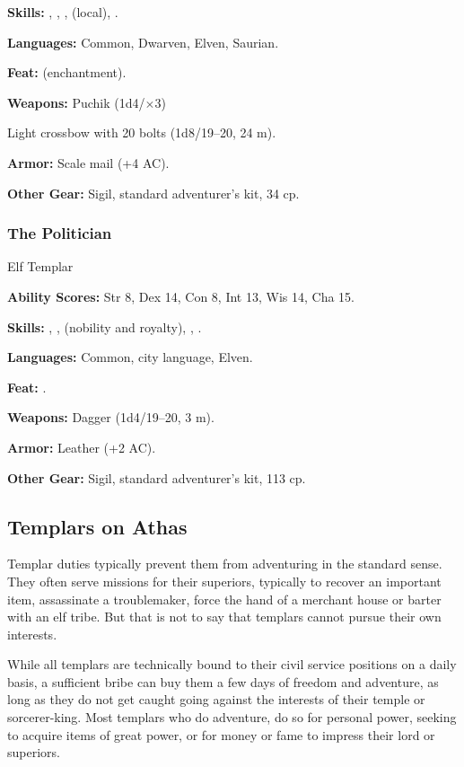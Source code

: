\textbf{Skills:} , , ,  (local), .

\textbf{Languages:} Common, Dwarven, Elven, Saurian.

\textbf{Feat:}  (enchantment).

\textbf{Weapons:} Puchik (1d4/$\times$3)

Light crossbow with 20 bolts (1d8/19--20, 24 m).

\textbf{Armor:} Scale mail (+4 AC).

\textbf{Other Gear:} Sigil, standard adventurer's kit, 34 cp.

\subsubsection{The Politician}
Elf Templar

\textbf{Ability Scores:} Str 8, Dex 14, Con 8, Int 13, Wis 14, Cha 15.

\textbf{Skills:} , ,  (nobility and royalty), , .

\textbf{Languages:} Common, city language, Elven.

\textbf{Feat:} .

\textbf{Weapons:} Dagger (1d4/19--20, 3 m).

\textbf{Armor:} Leather (+2 AC).

\textbf{Other Gear:} Sigil, standard adventurer's kit, 113 cp.


\subsection{Templars on Athas}
Templar duties typically prevent them from adventuring in the standard sense. They often serve missions for their superiors, typically to recover an important item, assassinate a troublemaker, force the hand of a merchant house or barter with an elf tribe. But that is not to say that templars cannot pursue their own interests.

While all templars are technically bound to their civil service positions on a daily basis, a sufficient bribe can buy them a few days of freedom and adventure, as long as they do not get caught going against the interests of their temple or sorcerer-king. Most templars who do adventure, do so for personal power, seeking to acquire items of great power, or for money or fame to impress their lord or superiors.

